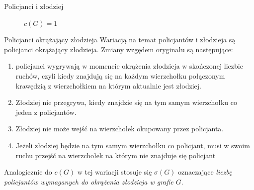 \documentclass[polish]{beamer}
\begin{document}
\begin{frame}{Policjanci i złodziej}
\begin{examples}
\begin{figure}
\begin{columns}[t]
{
                        \caption{$c\left(G\right) = 1$}
                    }
            \end{columns}
        \end{figure}      
    \end{examples}
\end{frame}

\begin{frame}{Policjanci okrążający złodzieja}
    Wariacją na temat policjantów i złodzieja są policjanci okrążający złodzieja.\cite{c_s_r}
    Zmiany wzgędem oryginału są następujące:
    \pause
    \begin{enumerate}[<+->]
        \item policjanci wygrywają w momencie okrążenia złodzieja w skończonej liczbie ruchów, 
        czyli kiedy znajdują się na każdym wierzchołku połączonym krawędzią z wierzchołkiem na którym aktualnie jest złodziej.
        \item Złodziej nie przegrywa, kiedy znajdzie się na tym samym wierzchołku co jeden z policjantów.
        \item Złodziej nie może wejść na wierzchołek okupowany przez policjanta.
        \item Jeżeli złodziej będzie na tym samym wierzchołku co policjant, 
        musi w swoim ruchu przejść na wierzchołek na którym nie znajduje się policjant
    \end{enumerate}
    \pause
    Analogicznie do $c\left(G\right)$ w tej wariacji stosuje się $\sigma\left(G\right)$ oznaczające \textit{liczbę policjantów wymaganych do okrążenia złodzieja w grafie $G$}.
\end{frame}

\end{document}
